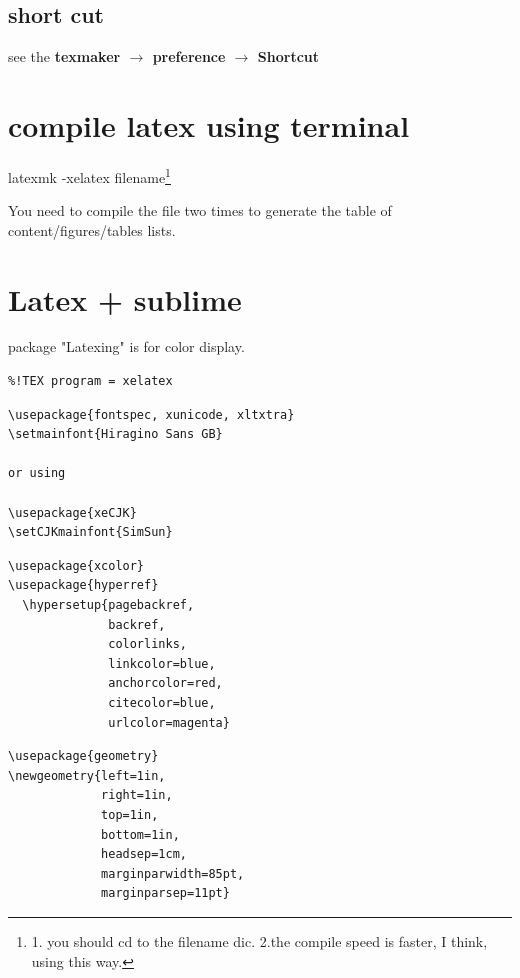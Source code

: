 \subsection{short cut}

see the \textbf{texmaker $\rightarrow$ preference $\rightarrow$ Shortcut}

\section{compile latex using terminal}

latexmk -xelatex filename\footnote{1. you should cd to the filename dic. 2.the compile speed is faster, I think, using this way.}

You need to compile the file two times to generate the table of content/figures/tables lists. 

\section{Latex + sublime}

package "Latexing" is for color display.

\begin{verbatim} 
%!TEX program = xelatex  
\end{verbatim} 


\begin{verbatim}
\usepackage{fontspec, xunicode, xltxtra}  
\setmainfont{Hiragino Sans GB}  

or using 

\usepackage{xeCJK}
\setCJKmainfont{SimSun}

\end{verbatim} 

\begin{verbatim}
\usepackage{xcolor}
\usepackage{hyperref}
  \hypersetup{pagebackref,
              backref,
              colorlinks,
              linkcolor=blue,
              anchorcolor=red,
              citecolor=blue,
              urlcolor=magenta} 
\end{verbatim} 
                 
\begin{verbatim}                 
\usepackage{geometry}
\newgeometry{left=1in,
             right=1in,
             top=1in,
             bottom=1in,
             headsep=1cm,
             marginparwidth=85pt,
             marginparsep=11pt}             
\end{verbatim} 

